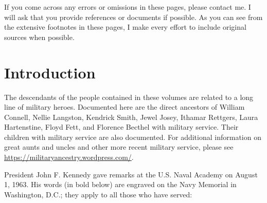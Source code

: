 \documentclass[11pt,letter]{book}
\begin{document}
If you come across any errors or omissions in these pages, please contact me.  I will ask that you provide references or documents if possible.  As you can see from the extensive footnotes in these pages, I make every effort to include original sources when possible.

\tableofcontents
\mainmatter
\chapter{Introduction}

The descendants of the people contained in these volumes are related to a long line of military heroes.  Documented here are the direct ancestors of William Connell, Nellie Langston, Kendrick Smith, Jewel Josey, Ithamar Rettgers, Laura Hartenstine, Floyd Fett, and Florence Becthel with military service.  Their children with military service are also documented.  For additional information on great aunts and uncles and other more recent military service, please see \url{https://militaryancestry.wordpress.com/}.

President John F. Kennedy gave remarks at the U.S. Naval Academy on August 1, 1963.  His words (in bold below) are engraved on the Navy Memorial in Washington, D.C.;  they apply to all those who have served:
\end{document}
